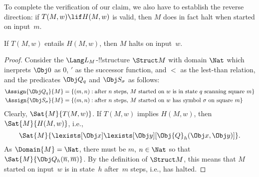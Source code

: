 \documentclass[../../../include/open-logic-section]{subfiles}
\begin{document}
\begin{explain} 
To complete the verification of our claim, we also have to
establish the reverse direction: if $T(M, w) \lif H(M, w)$ is valid, then
$M$ does in fact halt when started on input~$m$. 
\end{explain}

\begin{lem}
If $T(M, w)$ entails $H(M, w)$, then $M$ halts on input~$w$.
\end{lem}

\begin{proof} 
Consider the $\Lang L_M$-!!{structure} $\Struct M$ with
domain $\Nat$ which inerprets $\Obj 0$ as $0$, $'$ as the successor
function, and $<$ as the lest-than relation, and the predicates $\Obj Q_q$
and $\Obj S_\sigma$ as follows:
\begin{align*}
  \Assign{\Obj Q_q}{M} & =
\{(m, n) : \text{after $n$ steps, $M$ started on $w$ is in state $q$
  scanning square~$m$}\} \\
\Assign{\Obj S_\sigma}{M} & = \{(m, n) :
\text{after $n$ steps, $M$ started on $w$ has symbol~$\sigma$ on
  square~$m$}\}
\end{align*}
Clearly, $\Sat{M}{T(M, w)}$. If $T(M, w)$
implies $H(M, w)$, then $\Sat{M}{H(M, w)}$, i.e.,
\[
\Sat{M}{\lexists[\Obj x]\lexists[\Obj y][\Obj{Q}_h(\Obj x, \Obj y)]}.
\]
As $\Domain{M} = \Nat$, there must be $m$, $n \in \Nat$ so that
$\Sat{M}{\Obj Q_h(\overline{n}, \overline{m})}$. By the definition of
$\Struct M$, this means that $M$ started on input~$w$ is in state~$h$
after~$m$ steps, i.e., has halted.
\end{proof}
\end{document}
